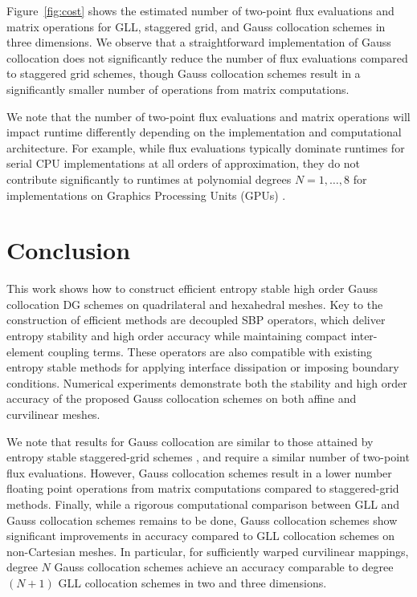 \documentclass[review,onefignum,onetabnum,final]{siamart171218}
\begin{document}
Figure~\ref{fig:cost} shows the estimated number of two-point flux evaluations and matrix operations for GLL, staggered grid, and Gauss collocation schemes in three dimensions.  We observe that a straightforward implementation of Gauss collocation does not significantly reduce the number of flux evaluations compared to staggered grid schemes, though Gauss collocation schemes result in a  significantly smaller number of operations from matrix computations.  

We note that the number of two-point flux evaluations and matrix operations will impact runtime differently depending on the implementation and computational architecture.  For example, while flux evaluations typically dominate runtimes for serial CPU implementations at all orders of approximation, they do not contribute significantly to runtimes at polynomial degrees $N=1,\ldots, 8$ for implementations on Graphics Processing Units (GPUs) \cite{wintermeyer2018entropy}.  

\section{Conclusion}

This work shows how to construct efficient entropy stable high order Gauss collocation DG schemes on quadrilateral and hexahedral meshes.  Key to the construction of efficient methods are decoupled SBP operators, which deliver entropy stability and high order accuracy while maintaining compact inter-element coupling terms.  These operators are also compatible with existing entropy stable methods for applying interface dissipation \cite{winters2017uniquely} or imposing boundary conditions.  Numerical experiments demonstrate both the stability and high order accuracy of the proposed Gauss collocation schemes on both affine and curvilinear meshes.  

We note that results for Gauss collocation are similar to those attained by entropy stable staggered-grid schemes \cite{parsani2016entropy}, and require a similar number of two-point flux evaluations.  However, Gauss collocation schemes result in a lower number floating point operations from matrix computations compared to staggered-grid methods.  Finally, while a rigorous computational comparison between GLL and Gauss collocation schemes remains to be done, Gauss collocation schemes show significant improvements in accuracy compared to GLL collocation schemes on non-Cartesian meshes.  In particular, for sufficiently warped curvilinear mappings, degree $N$ Gauss collocation schemes achieve an accuracy comparable to degree $(N+1)$ GLL collocation schemes in two and three dimensions.  
\end{document}
